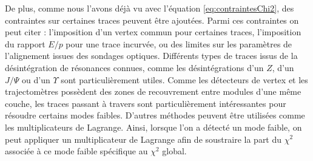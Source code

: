    \medskip
   
   De plus, comme nous l'avons d\'ejà vu avec l'\'equation \ref{eq:contraintesChi2}, des contraintes sur certaines traces peuvent \^etre ajout\'ees. Parmi ces contraintes on peut citer : l'imposition d'un vertex commun pour certaines traces, l'imposition du rapport $E/p$ pour une trace incurv\'ee, ou des limites sur les param\`etres de l'alignement issues des sondages optiques. Diff\'erents types de traces issus de la d\'esint\'egration de r\'esonances connues, comme les d\'esint\'egrations d'un $Z$, d'un $J/\Psi$ ou d'un $\Upsilon$ sont particuli\`erement utiles. Comme les d\'etecteurs de vertex et les trajectom\`etres poss\`edent des zones de recouvrement entre modules d'une m\^eme couche, les traces passant \`a travers sont particuli\`erement int\'eressantes pour r\'esoudre certains modes faibles. D'autres m\'ethodes peuvent \^etre utilis\'ees comme les multiplicateurs de Lagrange. Ainsi, lorsque l'on a d\'etect\'e un mode faible, on peut appliquer un multiplicateur de Lagrange \cite{Blusk:2007zza} afin de soustraire la part du $\chi^2$ associ\'ee \`a ce mode faible sp\'ecifique au $\chi^2$ global.
   
